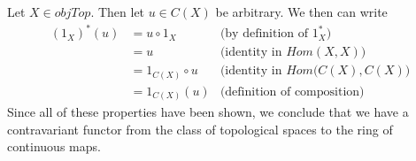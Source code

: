 \documentclass{article}
\theoremstyle{definition}
\begin{document}
         Let $X \in objTop$. Then let $u \in C(X)$ be arbitrary. We then can write 
        \begin{align}
            (1_X)^*(u) & = u \circ 1_X & \text{(by definition of $1_X^*$)} \\
            &= u & \text{(identity in $Hom(X,X)$)} \\
            &= 1_{C(X)} \circ u & \text{(identity in $Hom(C(X),C(X)$)} \\
            &= 1_{C(X)}(u) & \text{(definition of composition)}
        \end{align}
        Since all of these properties have been shown, we conclude that we have a contravariant functor from
        the class of topological spaces to the ring of continuous maps. 
\end{document}
